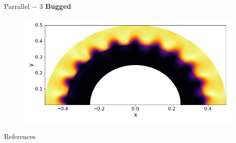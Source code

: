 \backupbegin

\begin{frame}[t]{Parrallel $-$ 3}
 \textbf{Bugged}
 \begin{figure}[!htbp]
   \includegraphics[width=0.85\linewidth]{fig/360x300parr}
   \centering
 \end{figure}
\end{frame}

\begin{frame}[t,fragile]{References}

  \tiny
  
  
\end{frame}





\backupend






